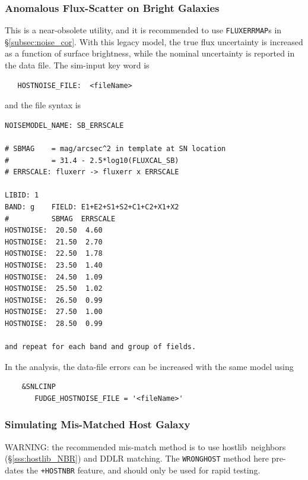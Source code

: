 \documentclass[12pt]{article}
\newcommand{\hostlib}{{\sc hostlib}}
\begin{document}
{\clearpage
\subsubsection{Anomalous Flux-Scatter on Bright Galaxies}

This is a near-obsolete utility, and it is recommended to use
{\tt FLUXERRMAP}s in \S\ref{subsec:noise_cor}.
With this legacy model, the true flux uncertainty is increased as a 
function of surface brightness, while the nominal uncertainty is 
reported in the data file.
The sim-input key word is
%
\begin{verbatim}
   HOSTNOISE_FILE:  <fileName>
\end{verbatim}
%
and the file syntax is
%
\begin{Verbatim}[frame=single]
NOISEMODEL_NAME: SB_ERRSCALE 

# SBMAG    = mag/arcsec^2 in template at SN location 
#          = 31.4 - 2.5*log10(FLUXCAL_SB) 
# ERRSCALE: fluxerr -> fluxerr x ERRSCALE 

LIBID: 1 
BAND: g    FIELD: E1+E2+S1+S2+C1+C2+X1+X2 
#          SBMAG  ERRSCALE  
HOSTNOISE:  20.50  4.60 
HOSTNOISE:  21.50  2.70 
HOSTNOISE:  22.50  1.78 
HOSTNOISE:  23.50  1.40 
HOSTNOISE:  24.50  1.09 
HOSTNOISE:  25.50  1.02 
HOSTNOISE:  26.50  0.99 
HOSTNOISE:  27.50  1.00 
HOSTNOISE:  28.50  0.99 

and repeat for each band and group of fields.
\end{Verbatim}
%
In the analysis, the data-file errors can be increased
with the same model using
\begin{verbatim}
    &SNLCINP
       FUDGE_HOSTNOISE_FILE = '<fileName>'
\end{verbatim}


   \subsubsection{Simulating Mis-Matched Host Galaxy}
   \label{sss:sim_wronghost}

WARNING: the recommended mis-match method is to use \hostlib\ neighbors
(\S\ref{sss:hostlib_NBR}) and DDLR matching. The {\tt WRONGHOST} method
here pre-dates the {\tt +HOSTNBR} feature, 
and should only be used for rapid testing.

}
\end{document}
